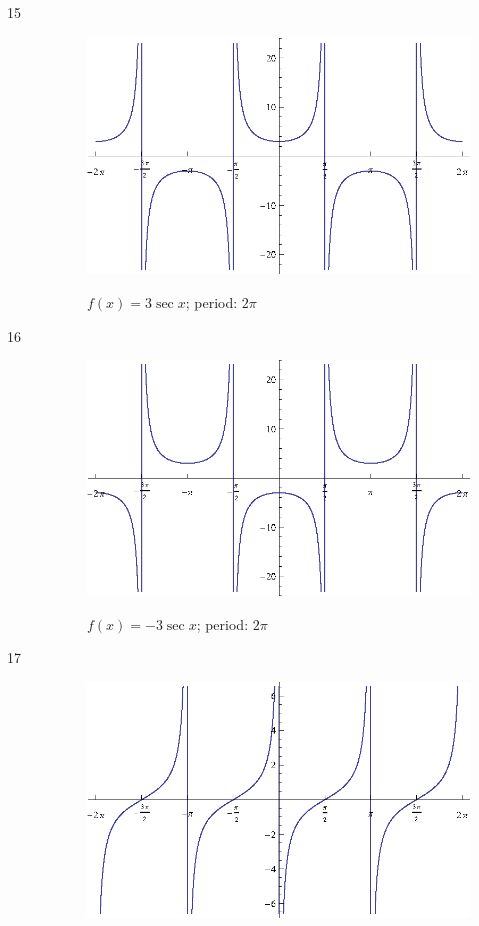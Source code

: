 \documentclass{exam}
\begin{document}
\begin{description}
      \item[15]
        \begin{figure}[H]
          \centering
          \includegraphics[scale=0.9]{exercise15.eps}

          $f(x) = 3 \sec x$; period: $2 \pi$
        \end{figure}

      \item[16]
        \begin{figure}[H]
          \centering
          \includegraphics[scale=0.9]{exercise16.eps}

          $f(x) = -3 \sec x$; period: $2 \pi$
        \end{figure}

      \item[17]
        \begin{figure}[H]
          \centering
          \includegraphics[scale=0.9]{exercise17.eps}


\end{figure}
\end{description}
\end{document}
